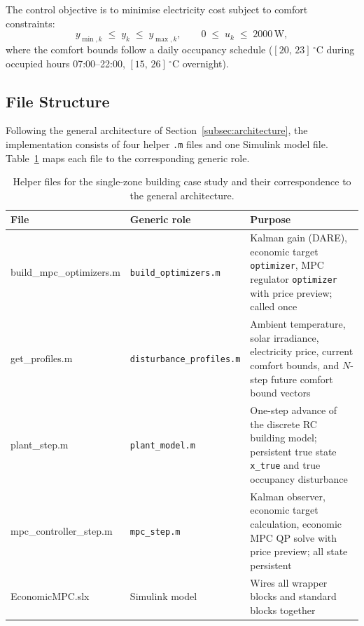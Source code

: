 The control objective is to minimise electricity cost subject to
comfort constraints:
\[
y_{\min,k} \;\leq\; y_k \;\leq\; y_{\max,k},
\qquad
0 \;\leq\; u_k \;\leq\; 2000\,\mathrm{W},
\]
where the comfort bounds follow a daily occupancy schedule
($[20,\,23]\,{}^\circ$C during occupied hours 07:00--22:00,
$[15,\,26]\,{}^\circ$C overnight).

\subsection{File Structure}
\label{subsec:filestructure}

Following the general architecture of Section~\ref{subsec:architecture},
the implementation consists of four helper \texttt{.m} files and one
Simulink model file.  Table~\ref{tab:files} maps each file to the
corresponding generic role.

\begin{table}[htbp]
	\centering
	\caption{Helper files for the single-zone building case study and their
		correspondence to the general architecture.}
	\label{tab:files}
	\begin{tabular}{>{\ttfamily\small}l >{\small}l >{\small}p{5.2cm}}
		\toprule
		\normalfont\textbf{File} & \textbf{Generic role} & \textbf{Purpose} \\
		\midrule
		build\_mpc\_optimizers.m & \texttt{build\_optimizers.m} &
		Kalman gain (DARE), economic target \texttt{optimizer}, MPC regulator
		\texttt{optimizer} with price preview; called once \\[4pt]
		get\_profiles.m & \texttt{disturbance\_profiles.m} &
		Ambient temperature, solar irradiance, electricity price, current
		comfort bounds, and $N$-step future comfort bound vectors \\[4pt]
		plant\_step.m & \texttt{plant\_model.m} &
		One-step advance of the discrete RC building model; persistent
		true state \texttt{x\_true} and true occupancy disturbance \\[4pt]
		mpc\_controller\_step.m & \texttt{mpc\_step.m} &
		Kalman observer, economic target calculation, economic MPC QP
		solve with price preview; all state persistent \\[4pt]
		EconomicMPC.slx & Simulink model &
		Wires all wrapper blocks and standard blocks together \\
		\bottomrule
	\end{tabular}
\end{table}

